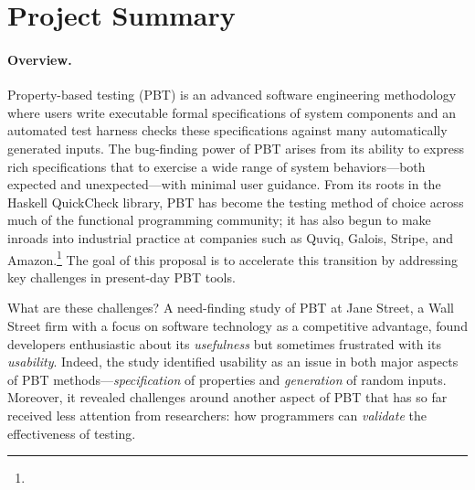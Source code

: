 \section*{Project Summary}


\newcommand{\summarysection}[1]{\paragraph*{#1.}}

\summarysection{Overview}
Property-based testing (PBT) is an advanced software engineering
methodology where users write executable formal specifications of system
components
and an automated test harness checks these specifications against
many automatically generated inputs.  The bug-finding power of PBT
arises from its ability to express rich specifications that
to exercise a wide range of system behaviors---both
expected and unexpected---with minimal user guidance.
%
From its roots in the Haskell QuickCheck library, PBT has become
the testing method of choice across much of the functional programming
community; it has also begun to make inroads into industrial practice
at companies such as Quviq, Galois, Stripe, and
Amazon.\footnote{\iflater{}\fi}
%
The goal of this proposal is to accelerate this transition
by addressing key challenges in
present-day PBT tools.

What are these challenges?
A need-finding study of PBT at Jane
Street, a Wall Street firm with a focus on software
technology as a competitive advantage, found developers enthusiastic
about its {\em usefulness} but
sometimes frustrated with its {\em usability}.
%
Indeed, the study identified usability as an issue in both major aspects
of PBT methods---{\em specification} of properties and {\em
  generation} of random inputs. Moreover, it revealed challenges
around another aspect of PBT that has so far received less attention from
researchers: how programmers can {\em validate} the
effectiveness of testing.


